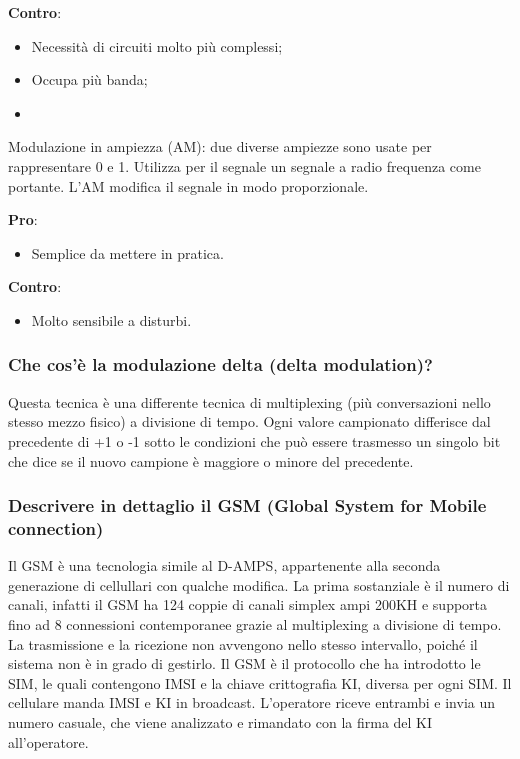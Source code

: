 \textbf{Contro}:

\begin{itemize}

\item Necessità di circuiti molto più complessi;
\item Occupa più banda;
\item 

\end{itemize}

Modulazione in ampiezza (AM): due diverse ampiezze sono usate per rappresentare 0 e 1. Utilizza
per il segnale un segnale a radio frequenza come portante. L’AM modifica il segnale in modo
proporzionale.

\textbf{Pro}:

\begin{itemize}

\item Semplice da mettere in pratica.

\end{itemize}

\textbf{Contro}:

\begin{itemize}

\item Molto sensibile a disturbi.

\end{itemize}

\subsubsection{Che cos'è la modulazione delta (delta modulation)?}

Questa tecnica è una differente tecnica di multiplexing (più conversazioni nello stesso mezzo fisico)
a divisione di tempo. Ogni valore campionato differisce dal precedente di +1 o -1 sotto le condizioni
che può essere trasmesso un singolo bit che dice se il nuovo campione è maggiore o minore del
precedente.

\subsubsection{Descrivere in dettaglio il GSM (Global System for Mobile connection)}

Il GSM è una tecnologia simile al D-AMPS, appartenente alla seconda generazione di cellullari con
qualche modifica. La prima sostanziale è il numero di canali, infatti il GSM ha 124 coppie di canali
simplex ampi 200KH e supporta fino ad 8 connessioni contemporanee grazie al multiplexing a
divisione di tempo. La trasmissione e la ricezione non avvengono nello stesso intervallo, poiché il
sistema non è in grado di gestirlo. Il GSM è il protocollo che ha introdotto le SIM, le quali
contengono IMSI e la chiave crittografia KI, diversa per ogni SIM. Il cellulare manda IMSI e KI in
broadcast. L'operatore riceve entrambi e invia un numero casuale, che viene analizzato e
rimandato con la firma del KI all'operatore.

